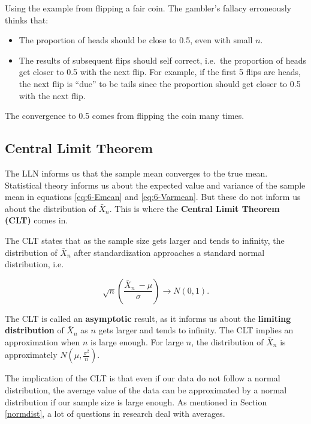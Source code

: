 \documentclass[
]{book}
\providecommand{\tightlist}{%
  \setlength{\itemsep}{0pt}\setlength{\parskip}{0pt}}
\begin{document}
Using the example from flipping a fair coin. The gambler's fallacy erroneously thinks that:

\begin{itemize}
\tightlist
\item
  The proportion of heads should be close to 0.5, even with small \(n\).
\item
  The results of subsequent flips should self correct, i.e.~the proportion of heads get closer to 0.5 with the next flip. For example, if the first 5 flips are heads, the next flip is ``due'' to be tails since the proportion should get closer to 0.5 with the next flip.
\end{itemize}

The convergence to 0.5 comes from flipping the coin many times.

\hypertarget{CLT}{%
\subsection{Central Limit Theorem}\label{CLT}}

The LLN informs us that the sample mean converges to the true mean. Statistical theory informs us about the expected value and variance of the sample mean in equations \eqref{eq:6-Emean} and \eqref{eq:6-Varmean}. But these do not inform us about the distribution of \(\bar{X}_n\). This is where the \textbf{Central Limit Theorem (CLT)} comes in.

The CLT states that as the sample size gets larger and tends to infinity, the distribution of \(\bar{X}_n\) after standardization approaches a standard normal distribution, i.e.

\begin{equation} 
\sqrt{n} \left(\frac{\bar{X}_n \ - \mu}{\sigma} \right) \to N(0,1).
\label{eq:6-CLT}
\end{equation}

The CLT is called an \textbf{asymptotic} result, as it informs us about the \textbf{limiting distribution} of \(\bar{X}_n\) as \(n\) gets larger and tends to infinity. The CLT implies an approximation when \(n\) is large enough. For large \(n\), the distribution of \(\bar{X}_n\) is approximately \(N(\mu, \frac{\sigma^2}{n})\).

The implication of the CLT is that even if our data do not follow a normal distribution, the average value of the data can be approximated by a normal distribution if our sample size is large enough. As mentioned in Section \ref{normdist}, a lot of questions in research deal with averages.
\end{document}
